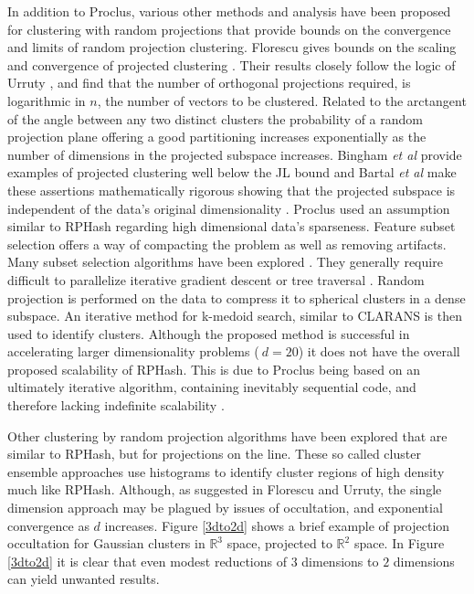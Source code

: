 In addition to Proclus, various other methods and analysis have been proposed for clustering with random projections
that provide bounds on the convergence and limits of random projection clustering.  Florescu gives bounds on the scaling
and convergence of projected clustering \cite{florescu09}. Their results closely follow the logic of Urruty
\cite{Urruty2007}, and find that the number of orthogonal projections required, is logarithmic in $n$, the number of
vectors to be clustered.  Related to the arctangent of the angle between any two distinct clusters the probability of a
random projection plane offering a good partitioning increases exponentially as the number of dimensions in the
projected subspace increases.  Bingham \emph{et al} provide examples of projected clustering well below the JL bound
\cite{bingham} and Bartal \emph{et al} make these assertions mathematically rigorous showing that the projected subspace
is independent of the data's original dimensionality \cite{bartal}.
Proclus used an assumption similar to \textsf{RPHash} regarding high dimensional data's sparseness.  Feature subset
selection offers a way of compacting the problem as well as removing artifacts.  Many subset selection algorithms have
been explored \cite{subset1,subset2,Yang,Kaski98}.  They generally require difficult to parallelize iterative gradient
descent \cite{Amdahl} or tree traversal \cite{Freeman}.  Random projection is performed on the data to compress it to
spherical clusters \cite{Dasgupta2000} in a dense subspace.  An iterative method for k-medoid search, similar to CLARANS
\cite{Clarans} is then used to identify clusters.  Although the proposed method is successful in accelerating larger
dimensionality problems ($~d=20$) it does not have the overall proposed scalability of \textsf{RPHash}.  This is due to
Proclus being based on an ultimately iterative algorithm, containing inevitably sequential code, and therefore lacking
indefinite scalability \cite{Amdahl}.

Other clustering by random projection algorithms have been explored that are similar to \textsf{RPHash}, but for
projections on the line.  These so called cluster ensemble approaches \cite{fernrandom,alweighted06,avogadri09} use
histograms to identify cluster regions of high density much like \textsf{RPHash}.  Although, as suggested in Florescu and
Urruty, the single dimension approach may be plagued by issues of occultation, and exponential convergence as $d$
increases.  Figure \ref{3dto2d} shows a brief example of projection occultation for Gaussian clusters in $\mathbb{R}^3$
space, projected to $\mathbb{R}^2$ space.  In Figure \ref{3dto2d} it is clear that even modest reductions of $3$
dimensions to $2$ dimensions can yield unwanted results.

